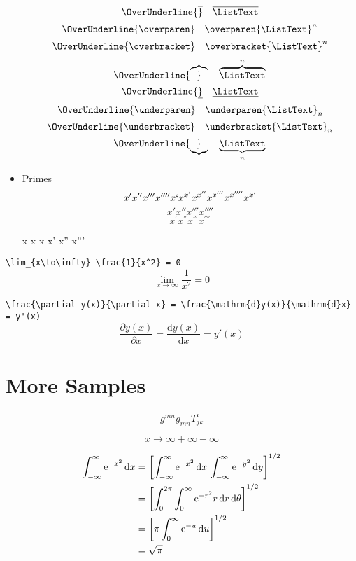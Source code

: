 \documentclass { article }
\begin{document}
\begin{itemize}
        \[ \OverUnderline{\overline}     \quad \overline     {\ListText}   \]
        \[ \OverUnderline{\overparen}    \quad \overparen    {\ListText}^n \]
        \[ \OverUnderline{\overbracket}  \quad \overbracket  {\ListText}^n \]
        \[ \OverUnderline{\overbrace}    \quad \overbrace    {\ListText}^n \]
        \[ \OverUnderline{\underline}    \quad \underline    {\ListText}   \]
        \[ \OverUnderline{\underparen}   \quad \underparen   {\ListText}_n \]
        \[ \OverUnderline{\underbracket} \quad \underbracket {\ListText}_n \]
        \[ \OverUnderline{\underbrace}   \quad \underbrace   {\ListText}_n \]
  \item Primes
        \[ x' x'' x''' x'''' x` x^{x'} x^{x''} x^{x'''} x^{x''''} x^{x`} \]
        \[ x \prime x \dprime x \trprime x \qprime \]
        \[ x^{\prime} x^{\dprime} x^{\trprime} x^{\qprime} \] %
        \begin{center}
          \firatext x x x x' x'' x'''
        \end{center}
\end{itemize}

\verb|\lim_{x\to\infty} \frac{1}{x^2} = 0|
\[ \lim_{x\to\infty} \frac{1}{x^2} = 0 \]

\verb|\frac{\partial y(x)}{\partial x} = \frac{\mathrm{d}y(x)}{\mathrm{d}x} = y'(x)|
\[ \frac{\partial y(x)}{\partial x} = \frac{\mathrm{d}y(x)}{\mathrm{d}x} = y'(x) \]

\section{More Samples}

\def\ee{\mathrm{e}}
\def\ii{\mathrm{i}}
\def\bm{\symbf}
\newcommand{\innerprod}[2]{\left\langle{#1}\middle\vert{#2}\right\rangle}
\newcommand{\brakket}[3]{\left\langle{#1}\middle\vert{#2}\middle\vert{#3}\right\rangle}

\[ g^{mn} g_{mn} T^{i}_{jk} \]

\[ x \to \infty + \infty - \infty \]

\begin{align*}
     \int_{-\infty}^\infty \ee^{-x^2} \dd{x}
  &= \qty[\int_{-\infty}^\infty \ee^{-x^2} \dd{x} \, \int_{-\infty}^\infty \ee^{-y^2} \dd{y}]^{1/2} \\
  &= \qty[\int_0^{2\pi} \int_0^\infty \ee^{-r^2} r \dd{r}\dd{\theta}]^{1/2} \\
  &= \qty[\pi \int_0^\infty \ee^{-u} \dd{u}]^{1/2} \\
  &= \sqrt{\pi}
\end{align*}
\end{document}
